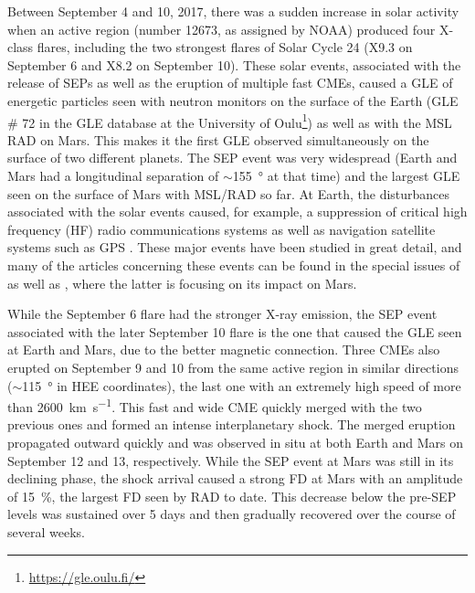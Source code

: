 Between September 4 and 10, 2017, there was a sudden increase in solar activity when an active region (number 12673, as assigned by NOAA) produced four X-class flares, including the two strongest flares of Solar Cycle 24 (X9.3 on September 6 and X8.2 on September 10).
These solar events, associated with the release of \acp{SEP} as well as the eruption of multiple fast \acp{CME}, caused a \ac{GLE} of energetic particles seen with neutron monitors on the surface of the Earth (\ac{GLE} \# 72 in the \ac{GLE} database at the University of Oulu\footnote{\url{https://gle.oulu.fi/}}) as well as with the \ac{MSL} \ac{RAD} on Mars. This makes it the first \ac{GLE} observed simultaneously on the surface of two different planets.
The \ac{SEP} event was very widespread (Earth and Mars had a longitudinal separation of $\sim$\SI{155}{\degree} at that time) and the largest \ac{GLE} seen on the surface of Mars with \ac{MSL}/\ac{RAD} so far. At Earth, the disturbances associated with the solar events caused, for example, a suppression of critical high frequency (HF) radio communications systems \citep{Frissell-2018,Bland-2018} as well as navigation satellite systems such as GPS \citep{Berdermann-2018,Sato-2019}.
These major events have been studied in great detail, and many of the articles concerning these events can be found in the special issues of \citet{SpaceWeather-2018-special-issue-September-event} as well as \citet{GRL-2018-special-issue-September-event}, where the latter is focusing on its impact on Mars.

While the September 6 flare had the stronger X-ray emission, the \ac{SEP} event associated with the later September 10 flare is the one that caused the \ac{GLE} seen at Earth and Mars, due to the better magnetic connection. Three \acp{CME} also erupted on September 9 and 10 from the same active region in similar directions ($\sim$\SI{115}{\degree} in \ac{HEE} coordinates), the last one with an extremely high speed of more than \SI{2600}{\kilo\meter\per\second}. This fast and wide \ac{CME} quickly merged with the two previous ones and formed an intense interplanetary shock. The merged eruption propagated outward quickly and was observed in situ at both Earth and Mars on September 12 and 13, respectively. While the \ac{SEP} event at Mars was still in its declining phase, the shock arrival caused a strong \ac{FD} at Mars with an amplitude of \SI{15}{\percent}, the largest \ac{FD} seen by \ac{RAD} to date. This decrease below the pre-\ac{SEP} levels was sustained over 5 days and then gradually recovered over the course of several weeks.

